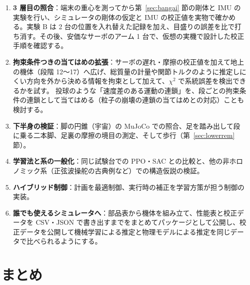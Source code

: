 \documentclass[paper=a4paper,fontsize=10pt,twocolumn,column_gap=2zw,line_length=24zw,number_of_lines=46,head_space=20mm]{jlreq}
\begin{document}
\begin{enumerate}\setlength{\itemsep}{0pt}
\item \textbf{3 層目の照合}：端末の重心を測ってから第~\ref{sec:bangai} 節の剛体と IMU の実験を行い、シミュレータの剛体の仮定と IMU の校正値を実物で確かめる。実験 B は 2 台の位置を入れ替えた記録を加え、目盛りの誤差を比で打ち消す。その後、安価なサーボのアーム 1 台で、仮想の実機で設計した校正手順を確認する。
\item \textbf{拘束条件つきの当てはめの拡張}：サーボの遅れ・摩擦の校正値を加えて地上の機体（段階 12〜17）へ広げ、総質量の計量や関節トルクのように推定しにくい方向を外から決める情報を拘束として加えて、$\chi^2$ で系統誤差を検出できるかを試す。
投球のような「速度差のある運動の連鎖」を、段ごとの拘束条件の連鎖として当てはめる（粒子の崩壊の連鎖の当てはめとの対応）ことも検討する。
\item \textbf{下半身の検証}：脚の円錐（宇宙）の MuJoCo での照合、足を踏み出して段に乗る二本脚、足裏の摩擦の境目の測定、そして歩行（第~\ref{sec:lowerrem} 節）。
\item \textbf{学習法と系の一般化}：同じ試験台での PPO・SAC との比較と、他の非ホロノミック系（正弦波操舵の古典例など）での構造仮説の検証。
\item \textbf{ハイブリッド制御}：計画を最適制御、実行時の補正を学習方策が担う制御の実装。
\item \textbf{誰でも使えるシミュレータへ}：部品表から機体を組み立て、性能表と校正データを CSV・JSON で書き出すまでをまとめてパッケージとして公開し、校正データを公開して機械学習による推定と物理モデルによる推定を同じデータで比べられるようにする。
\end{enumerate}


\section{まとめ}
\end{document}
